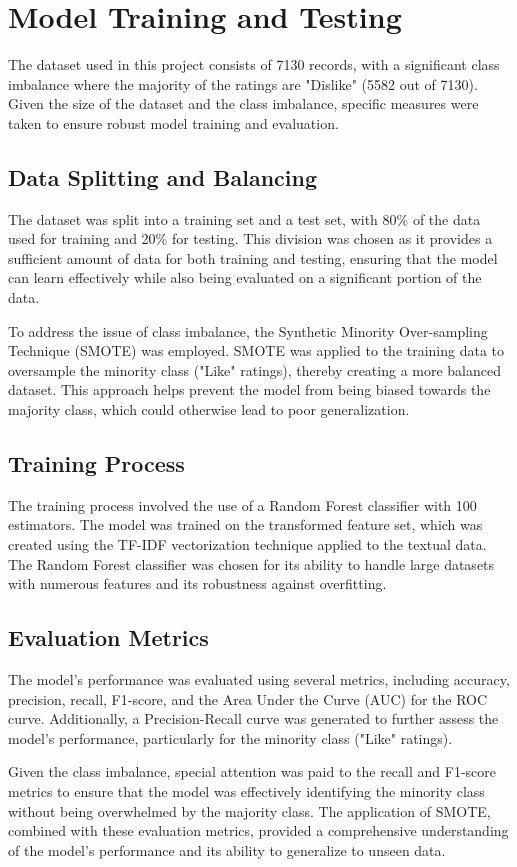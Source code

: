 \documentclass[sigconf]{acmart}
\begin{document}
	\section{Model Training and Testing}
	The dataset used in this project consists of 7130 records, with a significant class imbalance where the majority of the ratings are "Dislike" (5582 out of 7130). Given the size of the dataset and the class imbalance, specific measures were taken to ensure robust model training and evaluation.
	\subsection{Data Splitting and Balancing}
	The dataset was split into a training set and a test set, with 80\% of the data used for training and 20\% for testing. This division was chosen as it provides a sufficient amount of data for both training and testing, ensuring that the model can learn effectively while also being evaluated on a significant portion of the data.
	
	To address the issue of class imbalance, the Synthetic Minority Over-sampling Technique (SMOTE) was employed. SMOTE was applied to the training data to oversample the minority class ("Like" ratings), thereby creating a more balanced dataset. This approach helps prevent the model from being biased towards the majority class, which could otherwise lead to poor generalization.
	\subsection{Training Process}
	The training process involved the use of a Random Forest classifier with 100 estimators. The model was trained on the transformed feature set, which was created using the TF-IDF vectorization technique applied to the textual data. The Random Forest classifier was chosen for its ability to handle large datasets with numerous features and its robustness against overfitting.
	\subsection{Evaluation Metrics}
	The model's performance was evaluated using several metrics, including accuracy, precision, recall, F1-score, and the Area Under the Curve (AUC) for the ROC curve. Additionally, a Precision-Recall curve was generated to further assess the model's performance, particularly for the minority class ("Like" ratings). 
	
	Given the class imbalance, special attention was paid to the recall and F1-score metrics to ensure that the model was effectively identifying the minority class without being overwhelmed by the majority class. The application of SMOTE, combined with these evaluation metrics, provided a comprehensive understanding of the model's performance and its ability to generalize to unseen data.
\end{document}
